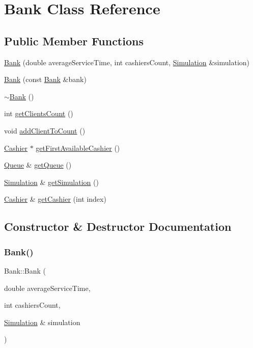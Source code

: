 \hypertarget{classBank}{}\section{Bank Class Reference}
\label{classBank}
\subsection*{Public Member Functions}
\begin{DoxyCompactItemize}
\item 
\hyperlink{classBank_a3b8503fa2fc7bd934b8c82afbd05fb4e}{Bank} (double average\+Service\+Time, int cashiers\+Count, \hyperlink{classSimulation}{Simulation} \&simulation)
\item 
\hyperlink{classBank_affa9032a547e660fa64b773fee47f612}{Bank} (const \hyperlink{classBank}{Bank} \&bank)
\item 
\hyperlink{classBank_a86eb33b90cf9dbf0a528155c5bfde004}{$\sim$\+Bank} ()
\item 
int \hyperlink{classBank_a46e579a690e0d3ca175923fcbae30a2d}{get\+Clients\+Count} ()
\item 
void \hyperlink{classBank_a2fe9f47aabc4fe73adc07af460f30dcc}{add\+Client\+To\+Count} ()
\item 
\hyperlink{classCashier}{Cashier} $\ast$ \hyperlink{classBank_a406e1fc9b050ed4559760c5a52fe81e4}{get\+First\+Available\+Cashier} ()
\item 
\hyperlink{classQueue}{Queue} \& \hyperlink{classBank_a79644f520ee9fafdfa1ffa303b84bb4a}{get\+Queue} ()
\item 
\hyperlink{classSimulation}{Simulation} \& \hyperlink{classBank_a8d181c1cfdea6b987602f9e2954cb7ad}{get\+Simulation} ()
\item 
\hyperlink{classCashier}{Cashier} \& \hyperlink{classBank_a7eb0b71ef408a8e9798eb1d28e1733ea}{get\+Cashier} (int index)
\end{DoxyCompactItemize}


\subsection{Constructor \& Destructor Documentation}
\mbox{\label{classBank_a3b8503fa2fc7bd934b8c82afbd05fb4e}} 
\subsubsection{\texorpdfstring{Bank()}{Bank()}\hspace{0.1cm}{\footnotesize\ttfamily [1/2]}}
{\footnotesize\ttfamily Bank\+::\+Bank (\begin{DoxyParamCaption}\item[{double}]{average\+Service\+Time,  }\item[{int}]{cashiers\+Count,  }\item[{\hyperlink{classSimulation}{Simulation} \&}]{simulation }\end{DoxyParamCaption})}

